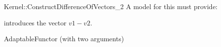 \begin{ccRefFunctionObjectConcept}{Kernel::ConstructDifferenceOfVectors_2}
A model for this must provide:




            {introduces the vector $v1 - v2$.}


\ccRefines
AdaptableFunctor (with two arguments)

\ccSeeAlso
{}\\

\end{ccRefFunctionObjectConcept}
